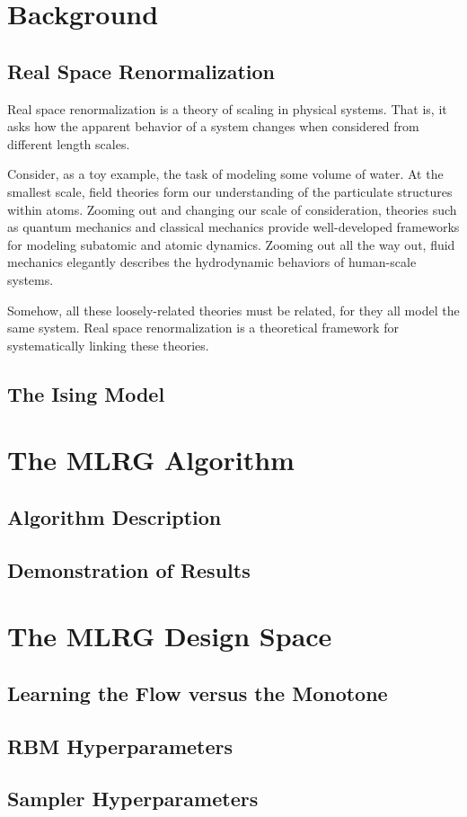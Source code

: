\documentclass[%
    reprint,
    amsmath,amssymb,
    aps
]{revtex4-2}
\begin{document}
\section{Background}

\subsection{Real Space Renormalization}

Real space renormalization is a theory of scaling in physical systems. 
That is, it asks how the apparent behavior of a system changes when considered 
from different length scales. 

Consider, as a toy example, the task of modeling some volume of water. 
At the smallest scale, field theories form our understanding of the particulate 
structures within atoms. 
Zooming out and changing our scale of consideration, theories such as quantum 
mechanics and classical mechanics provide well-developed frameworks for modeling 
subatomic and atomic dynamics. 
Zooming out all the way out, fluid mechanics elegantly describes 
the hydrodynamic behaviors of human-scale systems. 

Somehow, all these loosely-related theories must be related, for they 
all model the same system. 
Real space renormalization is a theoretical framework for systematically linking 
these theories. 

\subsection{The Ising Model}

\section{The MLRG Algorithm}

\subsection{Algorithm Description}

\subsection{Demonstration of Results}

\section{The MLRG Design Space}

\subsection{Learning the Flow versus the Monotone}

\subsection{RBM Hyperparameters}

\subsection{Sampler Hyperparameters}


\end{document}
